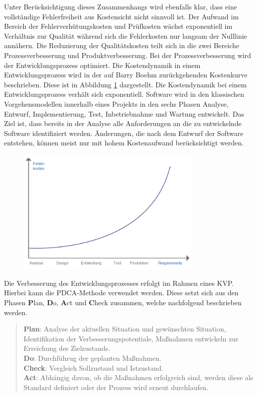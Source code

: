 Unter Berücksichtigung dieses Zusammenhangs wird ebenfalls klar, dass eine vollständige Fehlerfreiheit aus Kostensicht nicht sinnvoll ist.
Der Aufwand im Bereich der Fehlerverhütungskosten und Prüfkosten wächst exponentiell im Verhältnis zur Qualität während sich die Fehlerkosten nur langsam der Nulllinie annähern.
\newparagraph
Die Reduzierung der Qualitätskosten teilt sich in die zwei Bereiche Prozessverbesserung und Produktverbesserung.
Bei der Prozessverbesserung wird der Entwicklungsprozess optimiert.
Die Kostendynamik in einem Entwicklungsprozess wird in der auf Barry Boehm zurückgehenden Kostenkurve beschrieben.
Diese ist in Abbildung \ref{fig:boehm} dargestellt.
Die Kostendynamik bei einem Entwicklungsprozess verhält sich exponentiell.
Software wird in den klassischen Vorgehensmodellen innerhalb eines Projekts in den sechs Phasen Analyse, Entwurf, Implementierung, Test, Inbetriebnahme und Wartung entwickelt.
Das Ziel ist, dass bereits in der Analyse alle Anforderungen an die zu entwickelnde Software identifiziert werden.
Änderungen, die nach dem Entwurf der Software entstehen, können meist nur mit hohem Kostenaufwand berücksichtigt werden.
\autocite[vgl.][S. 95]{witte_testmanagement_2019}
\begin{figure}[H]
    \centering
    \includegraphics[width=0.8\textwidth]{images/boehm.png}
    \label{fig:boehm}
\end{figure}\noindent
Die Verbesserung des Entwicklungsprozesses erfolgt im Rahmen eines \ac{KVP}.
Hierbei kann die PDCA-Methode verwendet werden.
Diese setzt sich aus den Phasen \textbf{P}lan, \textbf{D}o, \textbf{A}ct und \textbf{C}heck zusammen, welche nachfolgend beschrieben werden.
\begin{quote}
    \textbf{Plan}: Analyse der aktuellen Situation und gewünschten Situation, Identifikation der Verbesserungspotentiale, Maßnahmen entwickeln zur Erreichung des Zielzustands.\\
    \textbf{Do}: Durchführug der geplanten Maßnahmen.\\
    \textbf{Check}: Vergleich Sollzustand und Istzustand.\\
    \textbf{Act}: Abhängig davon, ob die Maßnahmen erfolgreich sind, werden diese als Standard definiert oder der Prozess wird erneut durchlaufen.
\end{quote}
